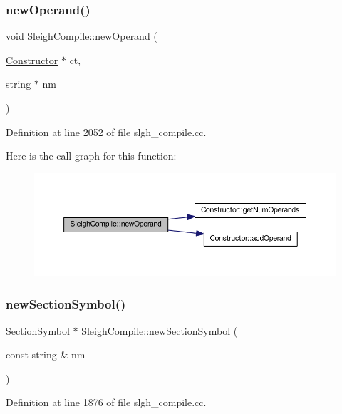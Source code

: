 \subsubsection{\texorpdfstring{newOperand()}{newOperand()}}
{\footnotesize\ttfamily void Sleigh\+Compile\+::new\+Operand (\begin{DoxyParamCaption}\item[{\mbox{\hyperlink{class_constructor}{Constructor}} $\ast$}]{ct,  }\item[{string $\ast$}]{nm }\end{DoxyParamCaption})}



Definition at line 2052 of file slgh\+\_\+compile.\+cc.

Here is the call graph for this function\+:
\nopagebreak
\begin{figure}[H]
\begin{center}
\leavevmode
\includegraphics[width=350pt]{class_sleigh_compile_a012c6e9fcecbbbaeea20a1e7cbe38e9d_cgraph}
\end{center}
\end{figure}
\mbox{\label{class_sleigh_compile_a1ba500a5fecf35e16b0721afa600e857}} 
\subsubsection{\texorpdfstring{newSectionSymbol()}{newSectionSymbol()}}
{\footnotesize\ttfamily \mbox{\hyperlink{class_section_symbol}{Section\+Symbol}} $\ast$ Sleigh\+Compile\+::new\+Section\+Symbol (\begin{DoxyParamCaption}\item[{const string \&}]{nm }\end{DoxyParamCaption})}



Definition at line 1876 of file slgh\+\_\+compile.\+cc.

